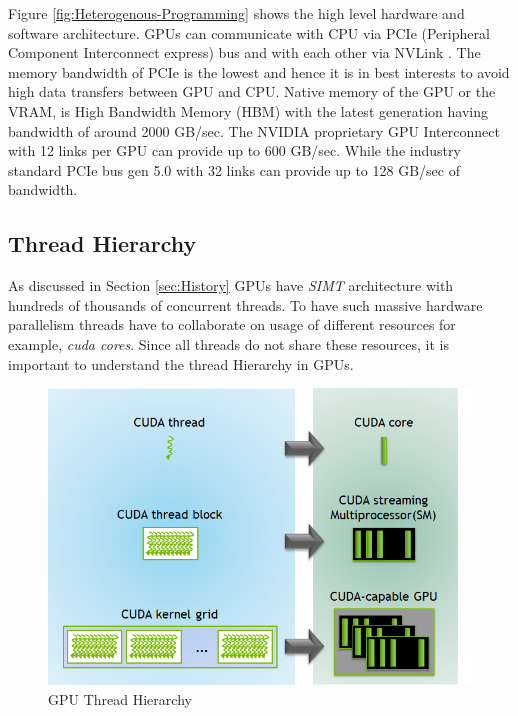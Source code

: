 Figure \ref{fig:Heterogenous-Programming} shows the high level hardware and software architecture.
GPUs can communicate with CPU via PCIe (Peripheral Component Interconnect express) bus and with each other via NVLink \texttrademark.
The memory bandwidth of PCIe is the lowest and hence it is in best interests to avoid high data transfers between GPU and CPU.
Native memory of the GPU or the VRAM, is High Bandwidth Memory (HBM) with the latest generation having bandwidth of around 2000 GB/sec.
The NVIDIA proprietary GPU Interconnect with 12 links per GPU can provide up to 600 GB/sec.
While the industry standard PCIe bus gen 5.0 with 32 links can provide up to 128 GB/sec of bandwidth.

\subsection{Thread Hierarchy}\label{sec:thread-hierarchy}
As discussed in Section \ref{sec:History} GPUs have \textit{SIMT} architecture with hundreds of thousands of concurrent threads.
To have such massive hardware parallelism threads have to collaborate on usage of different resources for example, \textit{cuda cores}.
Since all threads do not share these resources, it is important to understand the thread Hierarchy in GPUs.

\begin{figure}[h]
    \centering
    \includegraphics[width=\textwidth]{fig/thread-hierarchy.png}
    \caption{GPU Thread Hierarchy}
    \label{fig:Thread-Hierarchy}
\end{figure}

